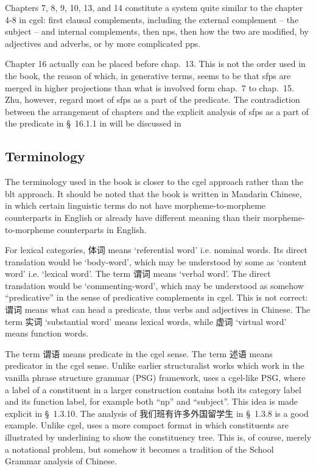 \documentclass[UTF8, a4paper, oneside, scheme=plain]{ctexart}
\newcommand*{\citesec}[1]{\S~{#1}}
\newcommand*{\citechap}[1]{chap.~{#1}}
\newcommand{\translate}[1]{`#1'}
\begin{document}
Chapters 7, 8, 9, 10, 13, and 14 constitute a system 
quite similar to the chapter 4-8 in \ac{cgel}:
first clausal complements, 
including the external complement -- the subject --
and internal complements,
then \ac{np}s,
then how the two are modified,
by adjectives and adverbs,
or by more complicated \acs{pp}s.

Chapter 16 actually can be placed before \citechap{13}.
This is not the order used in the book,
the reason of which, in generative terms,
seems to be that \ac{sfp}s are merged in higher projections than what is involved 
form \citechap{7} to \citechap{15}.
Zhu, however, regard most of \ac{sfp}s as a part of the predicate.
The contradiction between the arrangement of chapters 
and the explicit analysis of \ac{sfp}s as a part of the predicate in \citesec{16.1.1} 
in \citet{zhudexigrammar} 
will be discussed in %

\subsection{Terminology}

The terminology used in the book is closer to the \ac{cgel} approach rather than the \ac{blt} approach.
It should be noted that the book is written in Mandarin Chinese,
in which certain linguistic terms 
do not have morpheme-to-morpheme counterparts in English or
already have different meaning than their morpheme-to-morpheme counterparts in English.

For lexical categories, 体词 means \translate{referential word} i.e. nominal words.
Its direct translation would be \translate{body-word},
which may be understood by some as \translate{content word} i.e. \translate{lexical word}.
The term 谓词 means \translate{verbal word}.
The direct translation would be \translate{commenting-word},
which may be understood as somehow ``predicative'' in the sense of predicative complements in \ac{cgel}.
This is not correct: 
谓词 means what can head a predicate,
thus verbs and adjectives in Chinese.
The term 实词 \translate{substantial word} means lexical words,
while 虚词 \translate{virtual word} means function words.

The term 谓语 means predicate in the \ac{cgel} sense.
The term 述语 means predicator in the \ac{cgel} sense.
Unlike earlier structuralist works which work in the vanilla phrase structure grammar (PSG) framework,
\citet{zhudexigrammar} uses a \ac{cgel}-like PSG,
where a label of a constituent in a larger construction 
contains both its category label and its function label,
for example both ``\ac{np}'' and ``subject''.
This idea is made explicit in \citesec{1.3.10}.
The analysis of 我们班有许多外国留学生 in \citesec{1.3.8} is a good example.
Unlike \ac{cgel},
\citet{zhudexigrammar} uses a more compact format 
in which constituents are illustrated by underlining 
to show the constituency tree.
This is, of course, merely a notational problem,
but somehow it becomes a tradition of the School Grammar analysis of Chinese.
\end{document}
